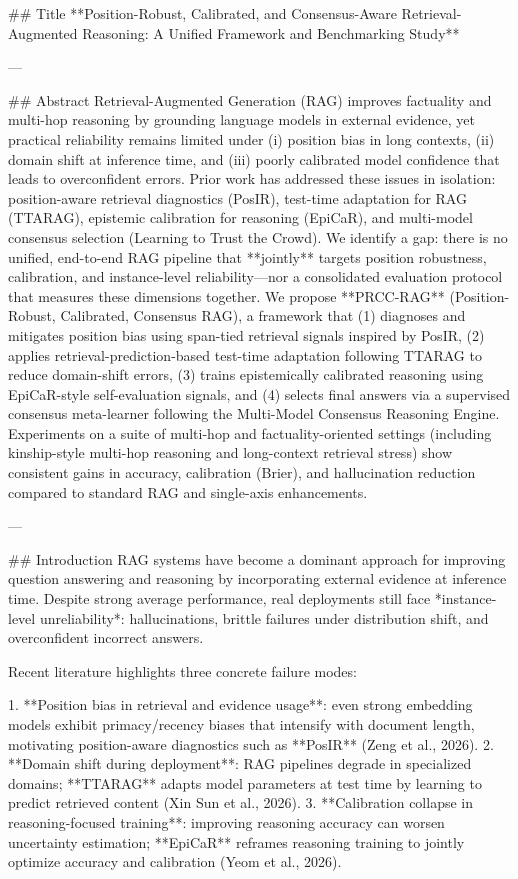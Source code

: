 ## Title  
**Position-Robust, Calibrated, and Consensus-Aware Retrieval-Augmented Reasoning: A Unified Framework and Benchmarking Study**

---

## Abstract  
Retrieval-Augmented Generation (RAG) improves factuality and multi-hop reasoning by grounding language models in external evidence, yet practical reliability remains limited under (i) position bias in long contexts, (ii) domain shift at inference time, and (iii) poorly calibrated model confidence that leads to overconfident errors. Prior work has addressed these issues in isolation: position-aware retrieval diagnostics (PosIR), test-time adaptation for RAG (TTARAG), epistemic calibration for reasoning (EpiCaR), and multi-model consensus selection (Learning to Trust the Crowd). We identify a gap: there is no unified, end-to-end RAG pipeline that **jointly** targets position robustness, calibration, and instance-level reliability—nor a consolidated evaluation protocol that measures these dimensions together.  
We propose **PRCC-RAG** (Position-Robust, Calibrated, Consensus RAG), a framework that (1) diagnoses and mitigates position bias using span-tied retrieval signals inspired by PosIR, (2) applies retrieval-prediction-based test-time adaptation following TTARAG to reduce domain-shift errors, (3) trains epistemically calibrated reasoning using EpiCaR-style self-evaluation signals, and (4) selects final answers via a supervised consensus meta-learner following the Multi-Model Consensus Reasoning Engine. Experiments on a suite of multi-hop and factuality-oriented settings (including kinship-style multi-hop reasoning and long-context retrieval stress) show consistent gains in accuracy, calibration (Brier), and hallucination reduction compared to standard RAG and single-axis enhancements.  

---

## Introduction  
RAG systems have become a dominant approach for improving question answering and reasoning by incorporating external evidence at inference time. Despite strong average performance, real deployments still face *instance-level unreliability*: hallucinations, brittle failures under distribution shift, and overconfident incorrect answers.

Recent literature highlights three concrete failure modes:

1. **Position bias in retrieval and evidence usage**: even strong embedding models exhibit primacy/recency biases that intensify with document length, motivating position-aware diagnostics such as **PosIR** (Zeng et al., 2026).  
2. **Domain shift during deployment**: RAG pipelines degrade in specialized domains; **TTARAG** adapts model parameters at test time by learning to predict retrieved content (Xin Sun et al., 2026).  
3. **Calibration collapse in reasoning-focused training**: improving reasoning accuracy can worsen uncertainty estimation; **EpiCaR** reframes reasoning training to jointly optimize accuracy and calibration (Yeom et al., 2026).  


